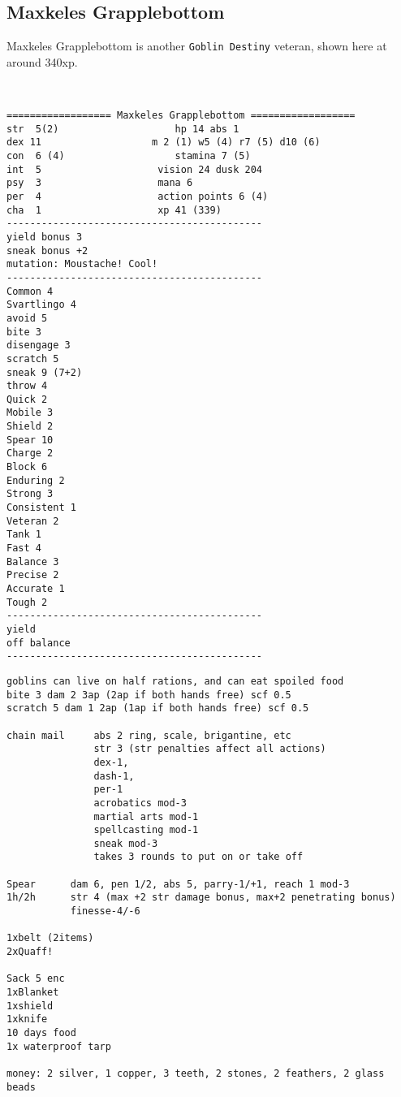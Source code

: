 \clearpage
\begin{samepage}
\subsection*{Maxkeles Grapplebottom}
\noindent Maxkeles Grapplebottom is another \texttt{Goblin Destiny} veteran, shown here at around 340xp.

\

\small \begin{verbatim}
================== Maxkeles Grapplebottom ==================
str  5(2)                    hp 14 abs 1
dex 11                   m 2 (1) w5 (4) r7 (5) d10 (6)
con  6 (4)                   stamina 7 (5)
int  5                    vision 24 dusk 204
psy  3                    mana 6
per  4                    action points 6 (4)
cha  1                    xp 41 (339)
--------------------------------------------
yield bonus 3
sneak bonus +2
mutation: Moustache! Cool!
--------------------------------------------
Common 4
Svartlingo 4
avoid 5
bite 3
disengage 3
scratch 5
sneak 9 (7+2)
throw 4
Quick 2
Mobile 3
Shield 2
Spear 10
Charge 2
Block 6
Enduring 2
Strong 3
Consistent 1
Veteran 2
Tank 1
Fast 4
Balance 3
Precise 2
Accurate 1
Tough 2
--------------------------------------------
yield
off balance
--------------------------------------------
\end{verbatim} \end{samepage} \clearpage \begin{samepage} \begin{verbatim}
goblins can live on half rations, and can eat spoiled food
bite 3 dam 2 3ap (2ap if both hands free) scf 0.5
scratch 5 dam 1 2ap (1ap if both hands free) scf 0.5

chain mail     abs 2 ring, scale, brigantine, etc
               str 3 (str penalties affect all actions)
               dex-1,
               dash-1,
               per-1
               acrobatics mod-3
               martial arts mod-1
               spellcasting mod-1
               sneak mod-3
               takes 3 rounds to put on or take off

Spear      dam 6, pen 1/2, abs 5, parry-1/+1, reach 1 mod-3
1h/2h      str 4 (max +2 str damage bonus, max+2 penetrating bonus)
           finesse-4/-6

1xbelt (2items)
2xQuaff!

Sack 5 enc
1xBlanket
1xshield
1xknife
10 days food
1x waterproof tarp

money: 2 silver, 1 copper, 3 teeth, 2 stones, 2 feathers, 2 glass beads
\end{verbatim} \end{samepage} \normalsize






